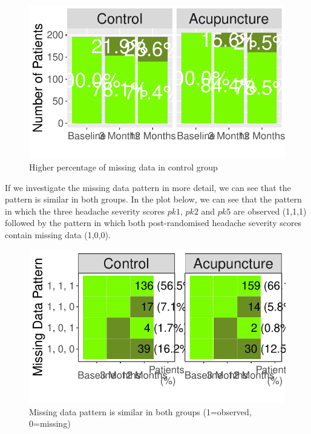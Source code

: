 \documentclass{article}
\newcommand{\pandocbounded}[1]{#1}
\begin{document}
\begin{figure}
\centering
\pandocbounded{\includegraphics[keepaspectratio]{Final_Report_files/figure-latex/unnamed-chunk-25-1.pdf}}
\caption{Higher percentage of missing data in control group}
\end{figure}

If we investigate the missing data pattern in more detail, we can see
that the pattern is similar in both groups. In the plot below, we can
see that the pattern in which the three headache severity scores
\(pk1\), \(pk2\) and \(pk5\) are observed (1,1,1) followed by the
pattern in which both post-randomised headache severity scores contain
missing data (1,0,0).

\begin{figure}
\centering
\pandocbounded{\includegraphics[keepaspectratio]{Final_Report_files/figure-latex/unnamed-chunk-26-1.pdf}}
\caption{Missing data pattern is similar in both groups (1=observed,
0=missing)}
\end{figure}
\end{document}
